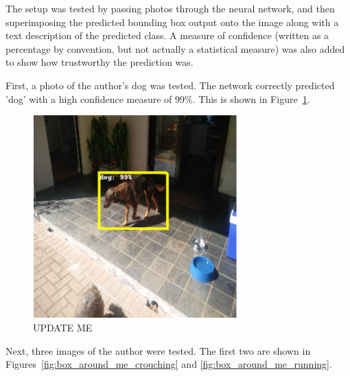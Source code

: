 
The setup was tested by passing photos through the neural network, and then superimposing the predicted bounding box output onto the image along with a text description of the predicted class. A measure of confidence (written as a percentage by convention, but not actually a statistical measure) was also added to show how trustworthy the prediction was.

First, a photo of the author's dog was tested. The network correctly predicted 'dog' with a high confidence measure of 99\%. This is shown in Figure~\ref{fig:box_around_blossom}.

\begin{figure}[h!]
  \centering
  \includegraphics[width=0.7\textwidth]{methodology/box_around_blossom}
  \caption{{\label{fig:box_around_blossom} UPDATE ME}}
\end{figure}

Next, three images of the author were tested. The first two are shown in Figures~\ref{fig:box_around_me_crouching} and \ref{fig:box_around_me_running}.

